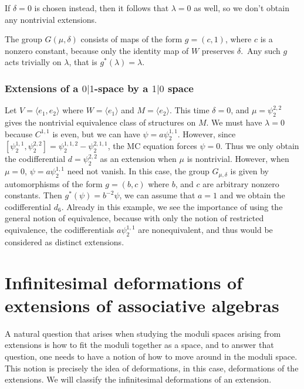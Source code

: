 \documentclass[12pt]{amsart}
\theoremstyle{definition}
\begin{document}
If $\delta=0$ is chosen instead, then it follows that
$\lambda=0$ as well, so we don't obtain any nontrivial
extensions.

The group $G(\mu,\delta)$ consists of maps of the
form $g=(c,1)$, where $c$ is a nonzero constant,
because only the identity map of $W$ preserves $\delta$.\
Any such $g$ acts trivially on $\lambda$, that is $g^*(\lambda)=\lambda$.

\subsubsection{Extensions of a $0|1$-space by a $1|0$ space}
Let $V=\langle e_1, e_2\rangle$ where $W=\langle e_1\rangle$ and $M=\langle e_2\rangle$.
This time $\delta=0$,
and $\mu={\psi^{{2,2}}_{2}}$ gives the nontrivial equivalence class of structures on $M$.
We must have
$\lambda=0$ because $C^{1,1}$ is even, but we can have $\psi=a{\psi^{{1,1}}_{2}}$.
However, since
$[{\psi^{{1,1}}_{2}},{\psi^{{2,2}}_{2}}]={\psi^{{1,1,2}}_{2}}-{\psi^{{2,1,1}}_{2}}$, the MC equation forces $\psi=0$. Thus we
only obtain the codifferential $d={\psi^{{2,2}}_{2}}$ as an extension when $\mu$ is nontrivial.
However,
when $\mu=0$, $\psi=a{\psi^{{1,1}}_{2}}$ need not vanish.
In this case, the group $G_{\mu,\delta}$ is given by
automorphisms of the form $g=(b,c)$ where $b$, and $c$ are arbitrary nonzero constants.
Then
$g^*(\psi)=b^{-2}\psi$,
we can assume that $a=1$ and we obtain the codifferential $d_6$.
Already in this example, we see the
importance of using the general notion of equivalence,
because with only the notion of restricted
equivalence, the codifferentials $a{\psi^{{1,1}}_{2}}$ are nonequivalent,
and thus would be considered as
distinct extensions.

\section{Infinitesimal deformations of extensions of associative algebras}\label{sec9}
A natural question that arises when studying the moduli spaces arising from extensions is how to fit the
moduli together as a space, and to answer that question, one needs to have a notion of how to move around
in the moduli space.  This notion is precisely the idea of deformations, in this case, deformations of
the extensions.  We will classify the infinitesimal deformations of an extension.
\end{document}
